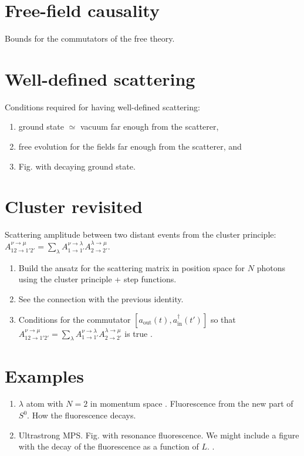 \documentclass[aps,pra,reprint,amsmath,amssymb]{revtex4-1}
\begin{document}
\section{Free-field causality}

{\color{blue}Bounds for the commutators of the free theory.}

\section{Well-defined scattering}

{\color{blue}Conditions required for having well-defined scattering:\newline

\begin{enumerate}
\item ground state $\simeq$ vacuum far enough from the scatterer,
\item free evolution for the fields far enough from the scatterer, and
\item Fig. with decaying ground state.
\end{enumerate}
}

\section{Cluster revisited}

{\color{blue}
Scattering amplitude between two distant events from the cluster principle: $A_{12\to 1'2'}^{\nu\to\mu} = \sum_\lambda A_{1\to 1'}^{\nu\to\lambda}A_{2\to 2'}^{\lambda\to\mu}$.
\begin{enumerate}
\item Build the ansatz for the scattering matrix in position space for $N$ photons using the cluster principle + step functions.
\item See the connection with the previous identity.
\item Conditions for the commutator $[a_\text{out}(t),a_\text{in}^\dagger(t')]$ so that $A_{12\to 1'2'}^{\nu\to\mu} = \sum_\lambda A_{1\to 1'}^{\nu\to\lambda}A_{2\to 2'}^{\lambda\to\mu}$ is true \cite{Xu2015}.
\end{enumerate}
}

\section{Examples}

{\color{blue}
\begin{enumerate}
\item $\lambda$ atom with $N=2$ in momentum space \cite{Xu2016}. Fluorescence from the new part of $S^0$. How the fluorescence decays.
\item Ultrastrong MPS. Fig. with resonance fluorescence. We might include a figure with the decay of the fluorescence as a function of $L$. \cite{Sanchez-Burillo2014,Sanchez-Burillo2015}.
\end{enumerate}
}
\end{document}
